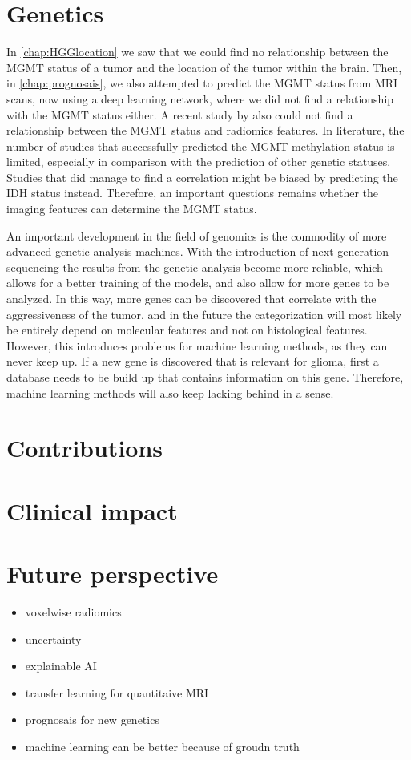 \section{Genetics}

In \ref{chap:HGGlocation} we saw that we could find no relationship between the \gls{MGMT} status of a tumor and the location of the tumor within the brain.
Then, in \cref{chap:prognosais}, we also attempted to predict the \gls{MGMT} status from \gls{MRI} scans, now using a deep learning network, where we did not find a relationship with the \gls{MGMT} status either.
A recent study by \citeauthor{mikkelsen2020mgmt} also could not find a relationship between the \gls{MGMT} status and radiomics features.
In literature, the number of studies that successfully predicted the MGMT methylation status is limited, especially in comparison with the prediction of other genetic statuses.
Studies that did manage to find a correlation might be biased by predicting the IDH status instead.
Therefore, an important questions remains whether the imaging features can determine the MGMT status.

An important development in the field of genomics is the commodity of more advanced genetic analysis machines.
With the introduction of next generation sequencing the results from the genetic analysis become more reliable, which allows for a better training of the models, and also allow for more genes to be analyzed.
In this way, more genes can be discovered that correlate with the aggressiveness of the tumor, and in the future the categorization will most likely be entirely depend on molecular features and not on histological features.
However, this introduces problems for machine learning methods, as they can never keep up.
If a new gene is discovered that is relevant for glioma, first a database needs to be build up that contains information on this gene.
Therefore, machine learning methods will also keep lacking behind in a sense.

\section{Contributions}

\section{Clinical impact}

\section{Future perspective}

\begin{itemize}
    \item voxelwise radiomics
    \item uncertainty
    \item explainable AI
    \item transfer learning for quantitaive MRI
    \item prognosais for new genetics
    \item machine learning can be better because of groudn truth
\end{itemize}
